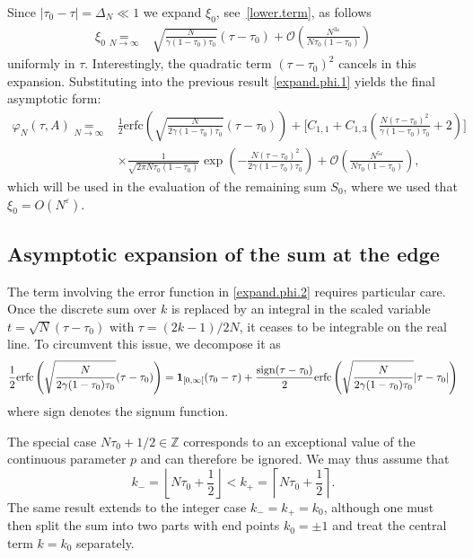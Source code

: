 \documentclass[pdflatex,sn-mathphys-num]{sn-jnl}
\theoremstyle{thmstyleone}
\numberwithin{equation}{section}
\begin{document}
Since $|\tau_0-\tau|=\Delta_N\ll1$ we expand $\xi_0$, see~\eqref{lower.term}, as follows
\begin{equation}
\begin{split}
\xi_0\underset{N\to\infty}{=}&\sqrt{\frac{N}{\gamma(1-\tau_0)\tau_0}}(\tau-\tau_0)+\mathcal{O}\left(\frac{N^{3\varepsilon}}{N\tau_0(1-\tau_0)}\right)
\end{split}
\end{equation}
uniformly in $\tau$. Interestingly, the quadratic term $(\tau-\tau_0)^2$ cancels in this expansion.
Substituting into the previous result \eqref{expand.phi.1} yields the final asymptotic form:
\begin{equation}\label{expand.phi.2}
\begin{split}
    \varphi_N(\tau,A)\underset{N\to\infty}{=}&\frac{1}{2}\mathrm{erfc}\left(\sqrt{\frac{N}{2\gamma(1-\tau_0)\tau_0}}(\tau-\tau_0)\right)+\biggl[C_{1,1}+C_{1,3}\left(\frac{N(\tau-\tau_0)^2}{\gamma(1-\tau_0)\tau_0}+2\right)\biggl]\\
    &\times\frac{1}{\sqrt{2\pi N\tau_0(1-\tau_0)}}\exp\left(-\frac{N(\tau-\tau_0)^2}{2\gamma(1-\tau_0)\tau_0}\right)+\mathcal{O}\left(\frac{N^{5\varepsilon}}{N\tau_0(1-\tau_0)}\right),
\end{split}
\end{equation}
which will be used in the evaluation of the remaining sum $S_0$, where we used that $\xi_0=O(N^\varepsilon)$.

\subsection{Asymptotic expansion of the sum at the edge}\label{sec:sum}


The term involving the error function in \eqref{expand.phi.2} requires particular care. Once the discrete sum over $k$ is replaced by an integral in the scaled variable $t=\sqrt{N}(\tau-\tau_0)$ with $\tau=(2k-1)/2N$, it ceases to be integrable on the real line. To circumvent this issue, we decompose it as
\begin{equation}
\frac{1}{2}\mathrm{erfc}\left(\sqrt{\frac{N}{2\gamma(1-\tau_0)\tau_0}}(\tau-\tau_0)\right)=\mathbf{1}_{\left[0, \infty\right[}(\tau_{0}-\tau)+\frac{{\rm sign}(\tau-\tau_0)}{2}\mathrm{erfc}\left(\sqrt{\frac{N}{2\gamma(1-\tau_0)\tau_0}}|\tau-\tau_0|\right)
\end{equation}
where $\mathrm{sign}$ denotes the signum function.

The special case $N\tau_0+1/2\in\mathbb{Z}$ corresponds to an exceptional value of the continuous parameter $p$ and can therefore be ignored. We may thus assume that
\begin{equation}\label{kminus.def}
k_-=\left\lfloor N\tau_0+\frac{1}{2}\right\rfloor<k_+=\left\lceil N\tau_0+\frac{1}{2}\right\rceil.
\end{equation}
The same result extends to the integer case $k_{-}=k_{+}=k_{0}$, although one must then split the sum into two parts with end points $k_{0}=\pm 1$ and treat the central term $k=k_{0}$ separately.
\end{document}
